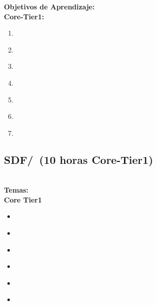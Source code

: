 \noindent \textbf{Objetivos de Aprendizaje:}\\
\noindent \textbf{Core-Tier1:}
\begin{enumerate}
	\setcounter{enumi}{0}
	\item \SDFFundamentalDataStructuresLODiscussTheOfData\xspace[\SDFFundamentalDataStructuresLODiscussTheOfDataLevel]\label{sec:BOK:SDFFundamentalDataStructuresLODiscussTheOfData}
	\item \SDFFundamentalDataStructuresLODescribeCommon\xspace[\SDFFundamentalDataStructuresLODescribeCommonLevel]\label{sec:BOK:SDFFundamentalDataStructuresLODescribeCommon}
	\item \SDFFundamentalDataStructuresLOWriteProgramsEach\xspace[\SDFFundamentalDataStructuresLOWriteProgramsEachLevel]\label{sec:BOK:SDFFundamentalDataStructuresLOWriteProgramsEach}
	\item \SDFFundamentalDataStructuresLOCompareAlternativeData\xspace[\SDFFundamentalDataStructuresLOCompareAlternativeDataLevel]\label{sec:BOK:SDFFundamentalDataStructuresLOCompareAlternativeData}
	\item \SDFFundamentalDataStructuresLODescribeHowFor\xspace[\SDFFundamentalDataStructuresLODescribeHowForLevel]\label{sec:BOK:SDFFundamentalDataStructuresLODescribeHowFor}
	\item \SDFFundamentalDataStructuresLOCompareAndCosts\xspace[\SDFFundamentalDataStructuresLOCompareAndCostsLevel]\label{sec:BOK:SDFFundamentalDataStructuresLOCompareAndCosts}
	\item \SDFFundamentalDataStructuresLOChooseTheStructure\xspace[\SDFFundamentalDataStructuresLOChooseTheStructureLevel]\label{sec:BOK:SDFFundamentalDataStructuresLOChooseTheStructure}
\end{enumerate}


\subsection{SDF/\SDFDevelopmentMethods~(10 horas Core-Tier1)}\label{sec:BOK:SDFDevelopmentMethods}
\SDFDevelopmentMethodsDescription\\
\noindent \textbf{Temas:}\\
\noindent \textbf{Core Tier1}
\begin{itemize}
	\item \SDFDevelopmentMethodsTopicProgram\label{sec:BOK:SDFDevelopmentMethodsTopicProgram}
	\item \SDFDevelopmentMethodsTopicProgramCorrecteness\label{sec:BOK:SDFDevelopmentMethodsTopicProgramCorrecteness}
	\item \SDFDevelopmentMethodsTopicSimple\label{sec:BOK:SDFDevelopmentMethodsTopicSimple}
	\item \SDFDevelopmentMethodsTopicModern\label{sec:BOK:SDFDevelopmentMethodsTopicModern}
	\item \SDFDevelopmentMethodsTopicDebugging\label{sec:BOK:SDFDevelopmentMethodsTopicDebugging}
	\item \SDFDevelopmentMethodsTopicDocumentation\label{sec:BOK:SDFDevelopmentMethodsTopicDocumentation}
\end{itemize}


